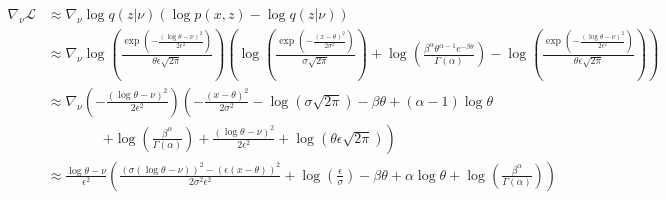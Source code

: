 \documentclass{article}
\begin{document}
\begin{equation}
    \begin{split}
        \nabla_\nu\mathcal{L} & \approx \nabla_\nu \log q(z|\nu) \left(\log p(x, z) - \log q(z|\nu)\right)                                                                                                                                                                                                                                                                                                                                                                           \\
                              & \approx \nabla_\nu\log \left(\frac{\exp\left(-\frac{(\log \theta - \nu)^2}{2\epsilon^2}\right)}{\theta\epsilon\sqrt{2\pi}}\right)\left(\log\left(\frac{\exp\left(-\frac{(x-\theta)^2}{2\sigma^2}\right)}{\sigma\sqrt{2\pi}}\right) +\log\left(\frac{\beta^\alpha \theta^{\alpha-1} e^{-\beta \theta}}{\Gamma(\alpha)}\right) -\log \left(\frac{\exp\left(-\frac{(\log \theta - \nu)^2}{2\epsilon^2}\right)}{\theta\epsilon\sqrt{2\pi}}\right)\right) \\
                              & \approx \nabla_\nu\left(-\frac{(\log \theta - \nu)^2}{2\epsilon^2}\right)\left(-\frac{(x-\theta)^2}{2\sigma^2} - \log\left(\sigma\sqrt{2\pi}\right) -\beta\theta +(\alpha-1)\log\theta \right.                                                                                                                                                                                                                                                       \\
                              & \qquad\qquad \left. +\log\left(\frac{\beta^\alpha}{\Gamma(\alpha)}\right) +\frac{(\log \theta - \nu)^2}{2\epsilon^2} +\log\left(\theta\epsilon\sqrt{2\pi}\right)\right)                                                                                                                                                                                                                                                                              \\
                              & \approx \frac{\log \theta - \nu}{\epsilon^2}\left(\frac{(\sigma(\log \theta - \nu))^2-(\epsilon(x-\theta))^2}{2\sigma^2\epsilon^2} +\log\left(\frac{\epsilon}{\sigma}\right) -\beta\theta +\alpha\log\theta +\log\left(\frac{\beta^\alpha}{\Gamma(\alpha)}\right)\right)
    \end{split}
\end{equation}
\end{document}
